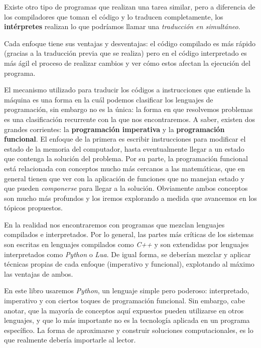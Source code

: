 Existe otro tipo de programas que realizan una tarea similar, pero a diferencia de los compiladores que toman el código y lo traducen completamente, los \textbf{intérpretes} realizan lo que podríamos llamar una \emph{traducción en simultáneo}. 

Cada enfoque tiene sus ventajas y desventajas: el código compilado es más rápido (gracias a la traducción previa que se realiza) pero en el código interpretado es más ágil el proceso de realizar cambios y ver cómo estos afectan la ejecución del programa.

El mecanismo utilizado para traducir los códigos a instrucciones que entiende la máquina es una forma en la cuál podemos clasificar los lenguajes de programación, sin embargo no es la única: la forma en que resolvemos problemas es una clasificación recurrente con la que nos encontraremos. A saber, existen dos grandes corrientes: la \textbf{programación imperativa} y la \textbf{programación funcional}. El enfoque de la primera es escribir instrucciones para modificar el estado de la memoria del computador, hasta eventualmente llegar a un estado que contenga la solución del problema. Por su parte, la programación funcional está relacionada con conceptos mucho más cercanos a las matemáticas, que en general tienen que ver con la aplicación de funciones que no manejan estado y que pueden \emph{componerse} para llegar a la solución. Obviamente ambos conceptos son mucho más profundos y los iremos explorando a medida que avancemos en los tópicos propuestos.

En la realidad nos encontraremos con programas que mezclan lenguajes compilados e interpretados. Por lo general, las partes más críticas de los sistemas son escritas en lenguajes compilados como \emph{C++} y son extendidas por lenguajes interpretados como \emph{Python} o \emph{Lua}. De igual forma, se deberían mezclar y aplicar técnicas propias de cada enfoque (imperativo y funcional), explotando al máximo las ventajas de ambos.

En este libro usaremos \emph{Python}, un lenguaje simple pero poderoso: interpretado, imperativo y con ciertos toques de programación funcional. Sin embargo, cabe anotar, que la mayoría de conceptos aquí expuestos pueden utilizarse en otros lenguajes, y que lo más importante no es la tecnología aplicada en un programa específico. La forma de aproximarse y construir soluciones computacionales, es lo que realmente debería importarle al lector.


